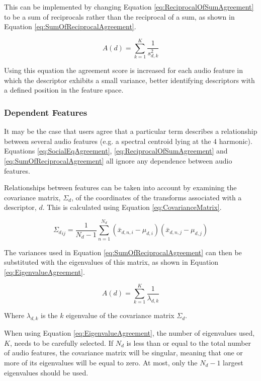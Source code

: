 			This can be implemented by changing Equation \ref{eq:ReciprocalOfSumAgreement} to be a sum of
			reciprocals rather than the reciprocal of a sum, as shown in Equation
			\ref{eq:SumOfReciprocalAgreement}.

			\begin{equation}
				A(d) = \sum_{k = 1}^{K} \frac{1}{s_{d,k}^{2}}
				\label{eq:SumOfReciprocalAgreement}
			\end{equation}

			Using this equation the agreement score is increased for each audio feature in which the
			descriptor exhibits a small variance, better identifying descriptors with a defined position in
			the feature space.

		\subsubsection*{Dependent Features}
			It may be the case that users agree that a particular term describes a relationship between several
			audio features (e.g. a spectral centroid lying at the 4 harmonic). Equations
			\ref{eq:SocialEqAgreement}, \ref{eq:ReciprocalOfSumAgreement} and \ref{eq:SumOfReciprocalAgreement}
			all ignore any dependence between audio features.

			Relationships between features can be taken into account by examining the covariance matrix,
			$\Sigma_{d}$, of the coordinates of the transforms associated with a descriptor, $d$. This is
			calculated using Equation \ref{eq:CovarianceMatrix}.

			\begin{equation}
				{\Sigma_{d}}_{ij} = \frac{1}{N_{d} - 1} \sum_{n = 1}^{N_{d}} 
						     (\bar{x}_{d,n,i} - \mu_{d,i})(\bar{x}_{d,n,j} - \mu_{d,j})
				\label{eq:CovarianceMatrix}
			\end{equation}
			
			The variances used in Equation \ref{eq:SumOfReciprocalAgreement} can then be substituted with the
			eigenvalues of this matrix, as shown in Equation \ref{eq:EigenvalueAgreement}.

			\begin{equation}
				A(d) = \sum_{k = 1}^{K} \frac{1}{\lambda_{d,k}}
				\label{eq:EigenvalueAgreement}
			\end{equation}
			
			Where $\lambda_{d, k}$ is the $k$ eigenvalue of the covariance matrix $\Sigma_{d}$.

			When using Equation \ref{eq:EigenvalueAgreement}, the number of eigenvalues used, $K$, needs to be
			carefully selected. If $N_{d}$ is less than or equal to the total number of audio features, the
			covariance matrix will be singular, meaning that one or more of its eigenvalues will be equal to
			zero. At most, only the $N_{d} - 1$ largest eigenvalues should be used.
			
